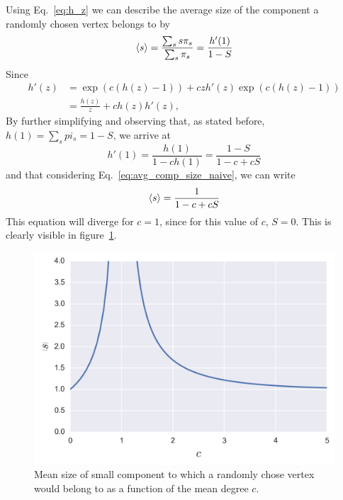 Using Eq.~\ref{eq:h_z} we can describe the average size of the component a randomly chosen vertex belongs to by
\begin{equation}
    \label{eq:avg_comp_size_naive}
	\left< s \right> = \frac{\sum_s s \pi_s}{\sum_s \pi_s} = \frac{h'(1)}{1-S}
\end{equation}
Since
\begin{align*}
	h'(z) & = \exp\left( c(h(z) - 1)  \right) 
	        + c z h'(z)\exp\left( c(h(z) - 1)  \right) \\
	      & = \frac{h(z)}{z} + c h(z) h'(z),
\end{align*}
By further simplifying and observing that, as stated before, $h(1) = \sum_s pi_s = 1 - S $, we arrive at 
\begin{equation}
	h'(1) = \frac{h(1)}{1- ch(1)} = \frac{1-S}{1 - c + c S}
\end{equation}
\noindent and that considering Eq.~\ref{eq:avg_comp_size_naive}, we can write
\begin{equation}
	\left< s \right> = \frac{1}{1-c+cS}
\end{equation}
This equation will diverge for $c=1$, since for this value of $c$, $S=0$.
This is clearly visible in figure~\ref{fig:mean_size_small_components}.
\begin{figure}[tb]
	\centering
	\includegraphics[scale=0.8]{figures/2_mean_size_small_components.png}
	\caption{Mean size of small component to which a randomly chose vertex would belong to as a function of the mean degree $c$.}
	\label{fig:mean_size_small_components}
\end{figure}

